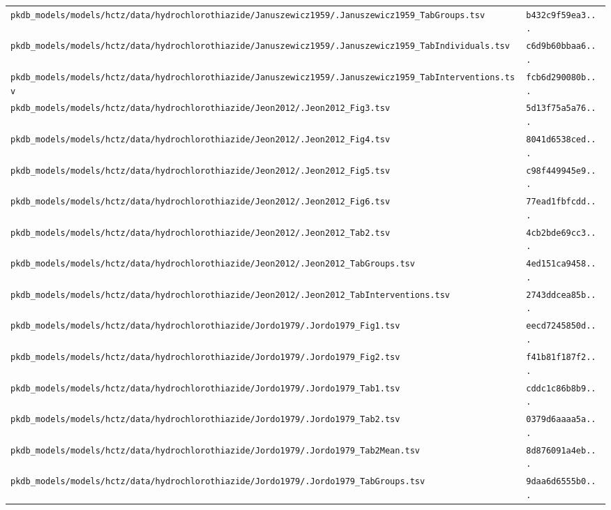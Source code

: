 \documentclass{article}
\begin{document}
\begin{longtable}{ll}
\texttt{pkdb\_models/models/hctz/data/hydrochlorothiazide/Januszewicz1959/.Januszewicz1959\_TabGroups.tsv} & \texttt{b432c9f59ea3...} \\
\texttt{pkdb\_models/models/hctz/data/hydrochlorothiazide/Januszewicz1959/.Januszewicz1959\_TabIndividuals.tsv} & \texttt{c6d9b60bbaa6...} \\
\texttt{pkdb\_models/models/hctz/data/hydrochlorothiazide/Januszewicz1959/.Januszewicz1959\_TabInterventions.tsv} & \texttt{fcb6d290080b...} \\
\texttt{pkdb\_models/models/hctz/data/hydrochlorothiazide/Jeon2012/.Jeon2012\_Fig3.tsv} & \texttt{5d13f75a5a76...} \\
\texttt{pkdb\_models/models/hctz/data/hydrochlorothiazide/Jeon2012/.Jeon2012\_Fig4.tsv} & \texttt{8041d6538ced...} \\
\texttt{pkdb\_models/models/hctz/data/hydrochlorothiazide/Jeon2012/.Jeon2012\_Fig5.tsv} & \texttt{c98f449945e9...} \\
\texttt{pkdb\_models/models/hctz/data/hydrochlorothiazide/Jeon2012/.Jeon2012\_Fig6.tsv} & \texttt{77ead1fbfcdd...} \\
\texttt{pkdb\_models/models/hctz/data/hydrochlorothiazide/Jeon2012/.Jeon2012\_Tab2.tsv} & \texttt{4cb2bde69cc3...} \\
\texttt{pkdb\_models/models/hctz/data/hydrochlorothiazide/Jeon2012/.Jeon2012\_TabGroups.tsv} & \texttt{4ed151ca9458...} \\
\texttt{pkdb\_models/models/hctz/data/hydrochlorothiazide/Jeon2012/.Jeon2012\_TabInterventions.tsv} & \texttt{2743ddcea85b...} \\
\texttt{pkdb\_models/models/hctz/data/hydrochlorothiazide/Jordo1979/.Jordo1979\_Fig1.tsv} & \texttt{eecd7245850d...} \\
\texttt{pkdb\_models/models/hctz/data/hydrochlorothiazide/Jordo1979/.Jordo1979\_Fig2.tsv} & \texttt{f41b81f187f2...} \\
\texttt{pkdb\_models/models/hctz/data/hydrochlorothiazide/Jordo1979/.Jordo1979\_Tab1.tsv} & \texttt{cddc1c86b8b9...} \\
\texttt{pkdb\_models/models/hctz/data/hydrochlorothiazide/Jordo1979/.Jordo1979\_Tab2.tsv} & \texttt{0379d6aaaa5a...} \\
\texttt{pkdb\_models/models/hctz/data/hydrochlorothiazide/Jordo1979/.Jordo1979\_Tab2Mean.tsv} & \texttt{8d876091a4eb...} \\
\texttt{pkdb\_models/models/hctz/data/hydrochlorothiazide/Jordo1979/.Jordo1979\_TabGroups.tsv} & \texttt{9daa6d6555b0...} \\

\end{longtable}
\end{document}
